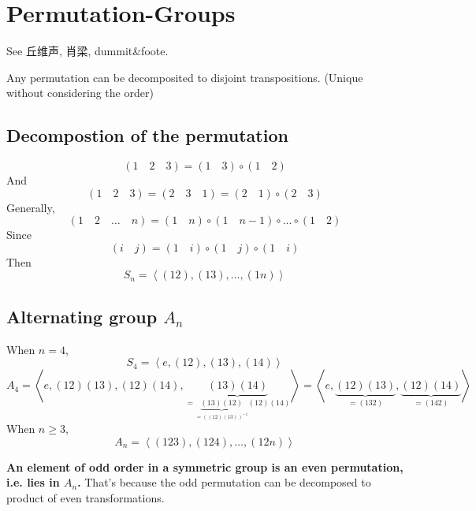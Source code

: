 \section{Permutation-Groups}

See 丘维声, 肖梁, dummit\&foote.

\begin{theorem}
Any permutation can be decomposited to disjoint transpositions. (Unique without considering the order)
\end{theorem}
\subsection{Decompostion of the permutation}
\[
(1\quad 2\quad 3)=(1\quad 3)\circ (1\quad 2)
\]
And
\[
(1\quad 2\quad 3)=(2\quad 3\quad 1)=(2\quad 1)\circ (2\quad 3)
\]
Generally,
\[
(1\quad 2\quad \dots \quad n)=(1\quad n)\circ (1\quad n-1)\circ \dots \circ (1\quad 2)
\]
Since
\[
(i\quad j)=(1\quad i)\circ (1\quad j)\circ (1\quad i)
\]
Then
\[
S_n= \left< (12),(13),\dots,(1n) \right>
\]
\subsection{Alternating group \texorpdfstring{$A_n$}{A_n}}

When $n=4$,
\[
S_4= \left< e,(12),(13),(14) \right>
\]
\[
A_4=\left< e,(12)(13),(12)(14),\underbrace{ (13)(14) }_{ =\underbrace{ (13)(12) }_{ =((12)(13))^{-1} }(12)(14) } \right>= \left< e,\underbrace{ (12)(13) }_{ =(132) },\underbrace{ (12)(14) }_{ =(142) } \right>
\]
When $n\geq3$,
\[
A_n=\left< (123),(124),\dots,(12n) \right>
\]
\begin{remark}
\textbf{An element of odd order in a symmetric group is an even permutation, i.e. lies in $A_n$.} That's because the odd permutation can be decomposed to product of even transformations.
\end{remark}